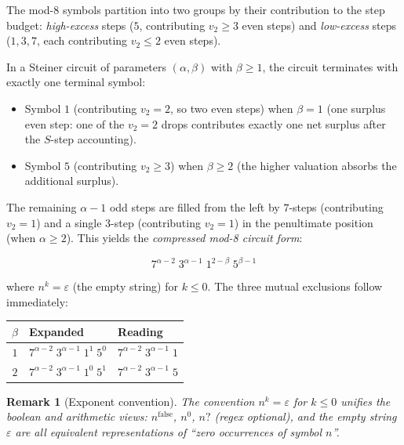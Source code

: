 \documentclass[11pt,a4paper]{article}
\theoremstyle{remark}
\theoremstyle{plain}
\newtheorem{remark}[theorem]{Remark}
\begin{document}
The mod-8 symbols partition into two groups by their contribution to the step budget:
\emph{high-excess} steps ($5$, contributing $v_2 \geq 3$ even steps)
and \emph{low-excess} steps ($1,3,7$, each contributing $v_2 \leq 2$ even steps).

In a Steiner circuit of parameters $(\alpha, \beta)$ with $\beta \geq 1$,
the circuit terminates with exactly
one terminal symbol:
\begin{itemize}
  \item Symbol $1$ (contributing $v_2 = 2$, so two even steps) when $\beta = 1$
        (one surplus even step: one of the $v_2=2$ drops contributes exactly one
        net surplus after the $S$-step accounting).
  \item Symbol $5$ (contributing $v_2 \geq 3$) when $\beta \geq 2$ (the higher
        valuation absorbs the additional surplus).
\end{itemize}
The remaining $\alpha - 1$ odd steps are filled from the left by $7$-steps
(contributing $v_2 = 1$) and a single $3$-step (contributing $v_2 = 1$) in the
penultimate position (when $\alpha \geq 2$).
This yields the \emph{compressed mod-8 circuit form}:

\begin{equation}
  \label{eq:compressed}
  7^{\alpha-2}\;3^{\alpha-1}\;1^{2-\beta}\;5^{\beta-1}
\end{equation}

where $n^k = \varepsilon$ (the empty string) for $k \leq 0$.
The three mutual exclusions follow immediately:

\begin{center}
\begin{tabular}{c|l|l}
\toprule
$\beta$ & Expanded & Reading \\
\midrule
$1$ & $7^{\alpha-2}\;3^{\alpha-1}\;1^1\;5^0$ & $7^{\alpha-2}\;3^{\alpha-1}\;1$ \\
$2$ & $7^{\alpha-2}\;3^{\alpha-1}\;1^0\;5^1$ & $7^{\alpha-2}\;3^{\alpha-1}\;5$ \\
\bottomrule
\end{tabular}
\end{center}

\begin{remark}[Exponent convention]
The convention $n^k = \varepsilon$ for $k \leq 0$ unifies the boolean
and arithmetic views: $n^{\text{false}}$, $n^0$, $n?$ (regex optional),
and the empty string $\varepsilon$ are all equivalent representations of
``zero occurrences of symbol $n$''.
\end{remark}
\end{document}
